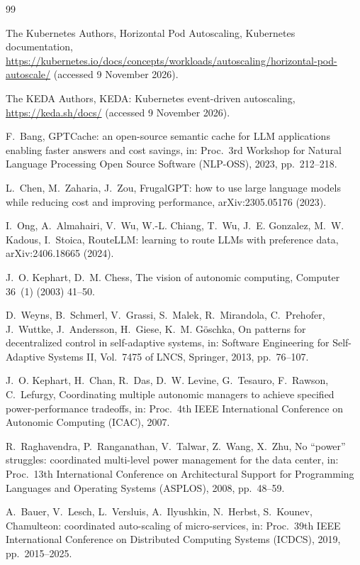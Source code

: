 \documentclass[preprint,12pt]{elsarticle}
\begin{document}
\begin{thebibliography}{99}

The Kubernetes Authors, Horizontal Pod Autoscaling, Kubernetes
documentation, \url{https://kubernetes.io/docs/concepts/workloads/autoscaling/horizontal-pod-autoscale/}
(accessed 9 November 2026).

The KEDA Authors, KEDA: Kubernetes event-driven autoscaling,
\url{https://keda.sh/docs/} (accessed 9 November 2026).

F.~Bang, GPTCache: an open-source semantic cache for LLM applications
enabling faster answers and cost savings, in: Proc.\ 3rd Workshop for
Natural Language Processing Open Source Software (NLP-OSS), 2023,
pp.~212--218.

L.~Chen, M.~Zaharia, J.~Zou, FrugalGPT: how to use large language models
while reducing cost and improving performance, arXiv:2305.05176 (2023).

I.~Ong, A.~Almahairi, V.~Wu, W.-L. Chiang, T.~Wu, J.~E. Gonzalez, M.~W.
Kadous, I.~Stoica, RouteLLM: learning to route LLMs with preference data,
arXiv:2406.18665 (2024).

J.~O. Kephart, D.~M. Chess, The vision of autonomic computing, Computer
36~(1) (2003) 41--50.

D.~Weyns, B.~Schmerl, V.~Grassi, S.~Malek, R.~Mirandola, C.~Prehofer,
J.~Wuttke, J.~Andersson, H.~Giese, K.~M. G\"oschka, On patterns for
decentralized control in self-adaptive systems, in: Software Engineering
for Self-Adaptive Systems II, Vol.\ 7475 of LNCS, Springer, 2013,
pp.~76--107.

J.~O. Kephart, H.~Chan, R.~Das, D.~W. Levine, G.~Tesauro, F.~Rawson,
C.~Lefurgy, Coordinating multiple autonomic managers to achieve specified
power-performance tradeoffs, in: Proc.\ 4th IEEE International Conference
on Autonomic Computing (ICAC), 2007.

R.~Raghavendra, P.~Ranganathan, V.~Talwar, Z.~Wang, X.~Zhu, No ``power''
struggles: coordinated multi-level power management for the data center,
in: Proc.\ 13th International Conference on Architectural Support for
Programming Languages and Operating Systems (ASPLOS), 2008, pp.~48--59.

A.~Bauer, V.~Lesch, L.~Versluis, A.~Ilyushkin, N.~Herbst, S.~Kounev,
Chamulteon: coordinated auto-scaling of micro-services, in: Proc.\ 39th
IEEE International Conference on Distributed Computing Systems (ICDCS),
2019, pp.~2015--2025.


\end{thebibliography}
\end{document}
